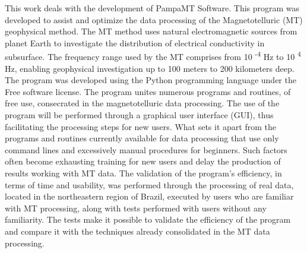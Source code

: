 \documentclass[12pt,twoside,oneright,a4paper,chapter=TITLE,english,brazil]{unipampa}
\begin{document}
\begin{resumoingles}
\noindent This work deals with the development of PampaMT Software. This program was developed to assist and optimize the data processing of the Magnetotelluric (MT) geophysical method. The MT method uses natural electromagnetic sources from planet Earth to investigate the distribution of electrical conductivity in subsurface. The frequency range used by the MT comprises from 10 \textsuperscript{-4} Hz to 10 \textsuperscript{4} Hz, enabling geophysical investigation up to 100 meters to 200 kilometers deep. The program was developed using the Python programming language under the Free software license. The program unites numerous programs and routines, of free use, consecrated in the magnetotelluric data processing. The use of the program will be performed through a graphical user interface (GUI), thus facilitating the processing steps for new users. What sets it apart from the programs and routines currently available for data processing that use only command lines and excessively manual procedures for beginners. Such factors often become exhausting training for new users and delay the production of results working with MT data.
The validation of the program's efficiency, in terms of time and usability, was performed through the processing of real data, located in the northeastern region of Brazil, executed by users who are familiar with MT processing, along with tests performed with users without any familiarity. The tests make it possible to validate the efficiency of the program and compare it with the techniques already consolidated in the MT data processing.
\end{resumoingles}


\listoffigures      %
\end{document}

